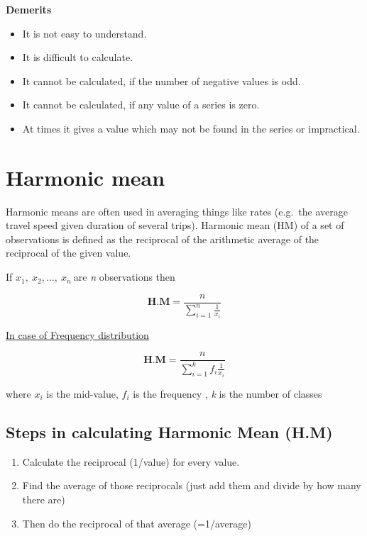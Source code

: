 \documentclass[
]{book}
\begin{document}
{\textbf{Demerits}}

\begin{itemize}
\item
  It is not easy to understand.
\item
  It is difficult to calculate.
\item
  It cannot be calculated, if the number of negative values is odd.
\item
  It cannot be calculated, if any value of a series is zero.
\item
  At times it gives a value which may not be found in the series or
  impractical.
\end{itemize}

\hypertarget{harmonic-mean}{%
\section{Harmonic mean}\label{harmonic-mean}}

Harmonic means are often used in averaging things like rates (e.g.~the
average travel speed given duration of several trips). Harmonic mean
(HM) of a set of observations is defined as the reciprocal of the
arithmetic average of the reciprocal of the given value.

If \(x_{1},\ x_{2},\ldots,\ x_{n}\ \)are \emph{n} observations then

\[\mathbf{\text{H.M}} = \frac{n}{\sum_{i = 1}^{n}\frac{1}{x_{i}}}\]

\underline{In case of Frequency distribution}

\[\mathbf{\text{H.M}} = \frac{n}{\sum_{i = 1}^{k}{f_{i}\frac{1}{x_{i}}}}\]

where \(x_{i}\) is the mid-value, \(f_{i}\) is the frequency , \emph{k} is the
number of classes

\hypertarget{steps-in-calculating-harmonic-mean-h.m}{%
\subsection{Steps in calculating Harmonic Mean (H.M)}\label{steps-in-calculating-harmonic-mean-h.m}}

\begin{enumerate}
\def\labelenumi{\arabic{enumi}.}
\item
  Calculate the reciprocal (1/value) for every value.
\item
  Find the average of those reciprocals (just add them and divide by
  how many there are)
\item
  Then do the reciprocal of that average (=1/average)
\end{enumerate}
\end{document}
